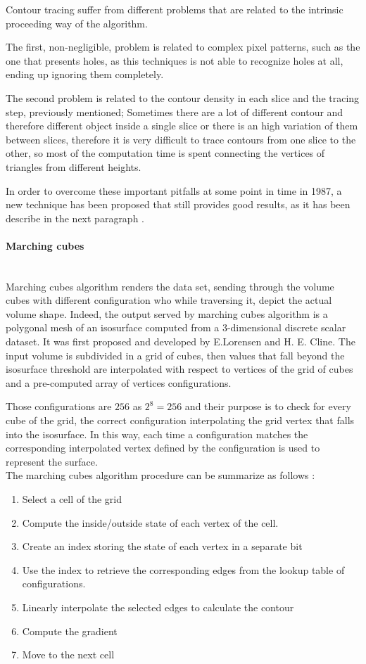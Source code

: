\documentclass[12pt,a4paper]{extarticle}
\newcommand{\linespace}{\vspace{0pt}}
\newcommand{\myparagraph}[1]{\paragraph{#1}\mbox{}\\}
\begin{document}
Contour tracing suffer from different problems that are related to the intrinsic  proceeding way of the algorithm.

The first, non-negligible, problem is related to complex pixel patterns, such as the one that presents holes, as this techniques is not able to recognize holes at all, ending up ignoring them completely.

The second problem is related to the contour density in each slice and the tracing step, previously mentioned; Sometimes there are a lot of different contour and therefore different object inside a single slice or there is an high variation of them between slices, therefore it is very difficult to trace contours from one slice to the other, so most of the computation time is spent connecting the vertices of triangles from different heights.
\linespace

In order to overcome these important pitfalls at some point in time in 1987, a new technique has been proposed that still provides good results, as it has been describe in the next paragraph \cite{Lorensen:1987:MCH:37402.37422}.
  

\myparagraph{Marching cubes}
Marching cubes algorithm renders the data set, sending through the volume cubes with different configuration who while traversing it, depict the actual volume shape. Indeed, the output served by marching cubes algorithm is a polygonal mesh of an isosurface computed from a 3-dimensional discrete scalar dataset. It was first proposed and developed by E.Lorensen and H. E. Cline. The input volume is subdivided in a grid of cubes, then values that fall beyond the isosurface threshold are interpolated with respect to vertices of the grid of cubes and a pre-computed array of vertices configurations.



Those configurations are $256$ as $2^8 = 256$ and their purpose is to check for every cube of the grid, the correct configuration interpolating the grid vertex that falls into the isosurface. In this way, each time a configuration matches the corresponding interpolated vertex defined by the configuration is used to represent the surface.\\
The marching cubes algorithm procedure can be summarize as follows \cite{SCHROEDER20053}:
\begin{enumerate}
\item Select a cell of the grid
\item Compute the inside/outside state of each vertex of the cell.
\item Create an index storing the state of each vertex in a separate bit
\item Use the index to retrieve the corresponding edges from the lookup table of configurations.
\item Linearly interpolate the selected edges to calculate the contour
\item Compute the gradient
\item Move to the next cell
\end{enumerate}
\end{document}
